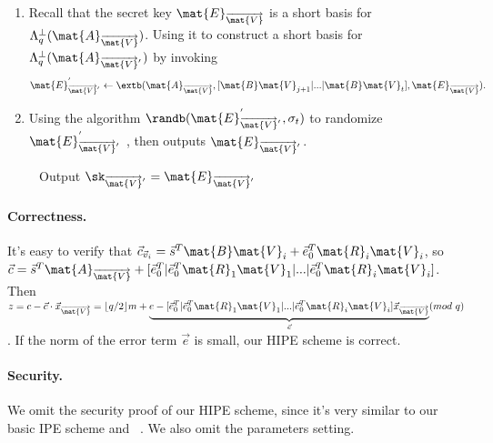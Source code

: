 \documentclass[11pt,hidelinks]{article}
\begin{document}
\begin{appendix}
\begin{enumerate}
\item Recall that the secret key $\mat{E}_{\overrightarrow{\mat{V}}}$ is a short basis for $\Lambda^{\perp}_{q}(\mat{A}_{\overrightarrow{\mat{V}}})$. Using it to construct a short basis for $\Lambda^{\perp}_{q}(\mat{A}_{\overrightarrow{\mat{V}}^{'}})$ by invoking
\begin{equation}
\mat{E}^{'}_{\overrightarrow{\mat{V}}^{'}} \leftarrow \extb ( \mat{A}_{\overrightarrow{\mat{V}}}, [\mat{B}\mat{V}_{j+1}|...|\mat{B}\mat{V}_{t}], \mat{E}_{\overrightarrow{\mat{V}}} ).
\end{equation}
\item Using the algorithm $\randb(\mat{E}^{'}_{\overrightarrow{\mat{V}}^{'}}, \sigma_{t})$ to randomize $\mat{E}^{'}_{\overrightarrow{\mat{V}}^{'}}$ , then outputs $\mat{E}_{\overrightarrow{\mat{V}}^{'}}$.
\end{enumerate}
~~~~~Output $\sk_{\overrightarrow{\mat{V}}^{'}}=\mat{E}_{\overrightarrow{\mat{V}}^{'}}$
\paragraph{Correctness.} It's easy to verify that $\vec{c}_{\vec{v}_{i}}=\vec{s}^{T}\mat{B}\mat{V}_{i}+\vec{e}^{T}_{0}\mat{R}_{i}\mat{V}_{i}$, so $\vec{c}=\vec{s}^{T}\mat{A}_{\overrightarrow{\mat{V}}}+[\vec{e}^{T}_{0}|\vec{e}^{T}_{0}\mat{R}_{1}\mat{V}_{1}|...|\vec{e}^{T}_{0}\mat{R}_{i}\mat{V}_{i}]$. Then $z=c-\vec{c}\cdot \vec{x}_{\overrightarrow{\mat{V}}}=\lfloor q/2 \rfloor m+\underbrace{e-[\vec{e}^{T}_{0}|\vec{e}^{T}_{0}\mat{R}_{1}\mat{V}_{1}|...|\vec{e}^{T}_{0}\mat{R}_{i}\mat{V}_{i}]\vec{x}_{\overrightarrow{\mat{V}}}}_{\vec{e}}(mod\ q)$. If the norm of the error term $\vec{e}$ is small, our HIPE scheme is correct.

\paragraph{Security.} We omit the security proof of our HIPE scheme, since it's very similar to our basic IPE scheme and ~\cite{LC:AbdDeCMoc12}. We also omit the parameters setting.



\end{appendix}
\end{document}
